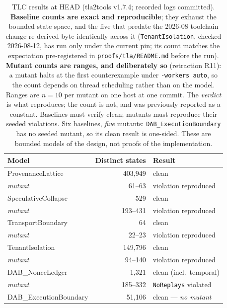 \documentclass[10pt,twocolumn,letterpaper]{article}
\newcommand{\plstates}{403{,}949}
\newcommand{\scstates}{529}
\newcommand{\tbstates}{64}
\newcommand{\tistates}{149{,}796}
\newcommand{\nlstates}{1{,}321}
\newcommand{\ebstates}{51{,}106}
\begin{document}
\begin{table}[t]
\centering\small
\begin{tabular}{@{}lrl@{}}
\toprule
\textbf{Model} & \textbf{Distinct states} & \textbf{Result}\\
\midrule
ProvenanceLattice          & \plstates{}    & clean \\
\quad\emph{mutant}         & 61--63         & violation reproduced \\
SpeculativeCollapse        & \scstates{}    & clean \\
\quad\emph{mutant}         & 193--431       & violation reproduced \\
TransportBoundary          & \tbstates{}    & clean \\
\quad\emph{mutant}         & 22--23         & violation reproduced \\
TenantIsolation            & \tistates{}    & clean \\
\quad\emph{mutant}         & 94--140        & violation reproduced \\
DAB\_NonceLedger           & \nlstates{}    & clean (incl.\ temporal) \\
\quad\emph{mutant}         & 185--332       & \texttt{NoReplays} violated \\
DAB\_ExecutionBoundary     & \ebstates{}    & clean --- \emph{no mutant} \\
\bottomrule
\end{tabular}
\caption{TLC results at HEAD (tla2tools v1.7.4; recorded logs committed).
\textbf{Baseline counts are exact and reproducible}; they exhaust the bounded
state space, and the five that predate the 2026-08 toolchain change re-derived
byte-identically across it (\texttt{TenantIsolation}, checked 2026-08-12, has
run only under the current pin; its count matches the expectation pre-registered
in \texttt{proofs/tla/README.md} before the run).
\textbf{Mutant counts are ranges, and deliberately so} (retraction R11): a mutant
halts at the first counterexample under \texttt{-workers auto}, so the count
depends on thread scheduling rather than on the model. Ranges are $n=10$ per
mutant on one host at one commit. The \emph{verdict} is what reproduces; the
count is not, and was previously reported as a constant.
Baselines must verify clean; mutants must reproduce their seeded violations.
Six baselines, \emph{five} mutants: \texttt{DAB\_ExecutionBoundary} has no
seeded mutant, so its clean result is one-sided. These are bounded models of
the design, not proofs of the implementation.}
\label{tab:tlc}
\end{table}
\end{document}
